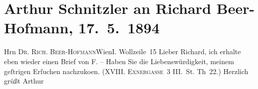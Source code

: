 

         
         \renewcommand{\erwaehntePersonen}{Personen: Richard Beer-Hofmann, Friedrich Michael Fels}
         \renewcommand{\erwaehnteOrte}{Orte: I., Innere Stadt, Krütznergasse, VIII., Josefstadt, Wien, Wollzeile}
         \renewcommand{\erwaehnteWerke}{}
               \section[Arthur Schnitzler an Richard Beer-Hofmann, 17. 5. 1894]{ Arthur Schnitzler an Richard Beer-Hofmann, 17. 5. 1894}\nopagebreak{}\rehead{ }\begin{ledgroupsized}[t]{13cm}\normalsize\beginnumbering \toendnotes[C]{\smallbreak\pagebreak[2]} 
\pstart{}{\pb}Hrn \textsc{Dr. Rich.
                     Beer-Hofmann}\pend{}\pstart{}Wien\pend{}\pstart{}I. Wollzeile 15\pend{}{\bigskip}\pstart
           \noindent{}{\pb}Lieber Richard, ich erhalte eben
               wieder einen Brief von \textsc{F.} – Haben Sie die Liebenswürdigkeit, meinem geſtrigen Erſuchen
                  nachzuko{\geminationm}en. (\textsc{XVIII. Exnergasse 3} III. St.
               Th 22.)\pend
           \pstart Herzlich grüßt \spacefill\mbox{Arthur}\pend{}
         
         \endnumbering{}\end{ledgroupsized}  \newcommand{\dateiname}{L00327}\newcommand{\titel}{Arthur Schnitzler an Richard Beer-Hofmann, 17. 5. 1894}\newcommand{\editorInnen}{Martin Anton Müller und Gerd-Hermann Susen}
      